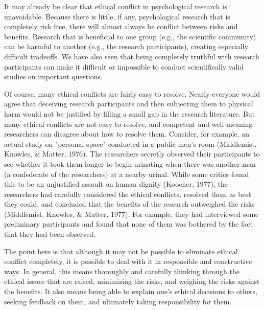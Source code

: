 It may already be clear that ethical conflict in psychological research is unavoidable. Because there is little, if any, psychological research that is completely risk free, there will almost always be conflict between risks and benefits. Research that is beneficial to one group (e.g., the scientific community) can be harmful to another (e.g., the research participants), creating especially difficult tradeoffs. We have also seen that being completely truthful with research participants can make it difficult or impossible to conduct scientifically valid studies on important questions.

Of course, many ethical conflicts are fairly easy to resolve. Nearly everyone would agree that deceiving research participants and then subjecting them to physical harm would not be justified by filling a small gap in the research literature. But many ethical conflicts are not easy to resolve, and competent and well-meaning researchers can disagree about how to resolve them. Consider, for example, an actual study on "personal space" conducted in a public men's room (Middlemist, Knowles, \& Matter, 1976). The researchers secretly observed their participants to see whether it took them longer to begin urinating when there was another man (a confederate of the researchers) at a nearby urinal. While some critics found this to be an unjustified assault on human dignity (Koocher, 1977), the researchers had carefully considered the ethical conflicts, resolved them as best they could, and concluded that the benefits of the research outweighed the risks (Middlemist, Knowles, \& Matter, 1977). For example, they had interviewed some preliminary participants and found that none of them was bothered by the fact that they had been observed.

The point here is that although it may not be possible to eliminate ethical conflict completely, it is possible to deal with it in responsible and constructive ways. In general, this means thoroughly and carefully thinking through the ethical issues that are raised, minimizing the risks, and weighing the risks against the benefits. It also means being able to explain one's ethical decisions to others, seeking feedback on them, and ultimately taking responsibility for them.

